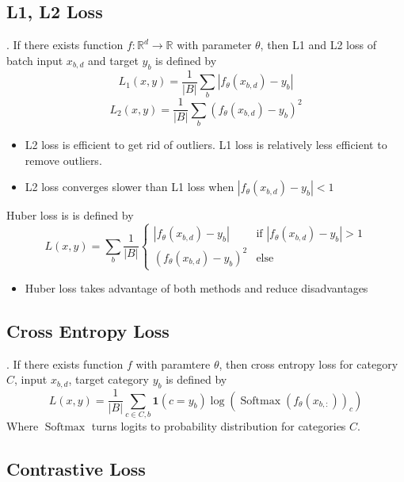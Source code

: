 \documentclass[8pt]{beamer}
\newcommand{\mbb}[1]{\mathbb{#1}}
\newcommand{\mb}[1]{\mathbf{#1}}
\newcommand{\abs}[1]{\left\lvert #1 \right\rvert}
\newcommand{\Softmax}[1]{\operatorname{Softmax}\!\left(#1\right)}
\begin{document}
\subsection{L1, L2 Loss}

\begin{frame}{.}
    If there exists function $f: \mbb{R}^d \to \mbb{R}$ with parameter $\theta$, then L1 and L2 loss of batch input $x_{b,d}$ and target $y_{b}$ is defined by
    \[
    L_1(x,y) = \frac{1}{\abs{B}}\sum_{b}\abs{f_\theta(x_{b,d}) - y_{b}}
    \]
    \[
    L_2(x,y) = \frac{1}{\abs{B}}\sum_{b} (f_\theta(x_{b,d}) - y_{b})^2
    \]

    \begin{itemize}
        \item L2 loss is efficient to get rid of outliers. L1 loss is relatively less efficient to remove outliers.
        \item L2 loss converges slower than L1 loss when $\abs{f_\theta(x_{b,d}) - y_b} < 1$
    \end{itemize}

    Huber loss is is defined by
    \[
        L(x,y)=\sum_b \frac{1}{\abs{B}}\begin{cases}
            \abs{f_\theta(x_{b,d}) - y_b} & \text{if } \abs{f_\theta(x_{b,d}) - y_b} > 1 \\
            (f_\theta(x_{b,d}) - y_b)^2 & \text{else} 
        \end{cases}
    \]
    \begin{itemize}
        \item Huber loss takes advantage of both methods and reduce disadvantages
    \end{itemize}
\end{frame}

\subsection{Cross Entropy Loss}

\begin{frame}{.}
    If there exists function $f$ with paramtere $\theta$, then cross entropy loss for category $C$, input $x_{b,d}$, target category $y_{b}$ is defined by
    \[
        L(x,y) = \frac{1}{\abs{B}} \sum_{c \in C, b} \mb{1}(c = y_b) \log{( \Softmax{f_\theta(x_{b, :})}_{c})}
    \]
    Where $\operatorname{Softmax}$ turns logits to probability distribution for categories $C$.
\end{frame}

\subsection{Contrastive Loss}
\end{document}
